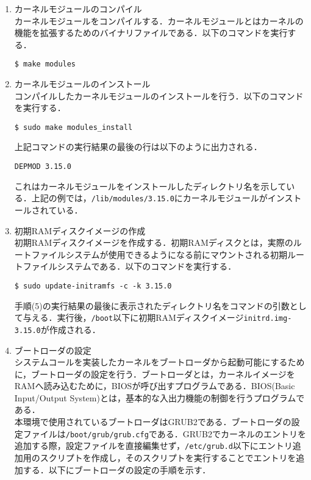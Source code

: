 \documentclass[12pt]{jsarticle}
\begin{document}
\begin{enumerate}
\item カーネルモジュールのコンパイル \\
  カーネルモジュールをコンパイルする．カーネルモジュールとはカーネルの機能を拡張するためのバイナリファイルである．以下のコマンドを実行する．

\begin{verbatim}
$ make modules
\end{verbatim}
  
\item カーネルモジュールのインストール \\
  コンパイルしたカーネルモジュールのインストールを行う．以下のコマンドを実行する．

\begin{verbatim}
$ sudo make modules_install
\end{verbatim}
上記コマンドの実行結果の最後の行は以下のように出力される．

\begin{verbatim}
DEPMOD 3.15.0
\end{verbatim}
これはカーネルモジュールをインストールしたディレクトリ名を示している．上記の例では，\verb|/lib/modules/3.15.0|にカーネルモジュールがインストールされている．

\item 初期RAMディスクイメージの作成 \\
  初期RAMディスクイメージを作成する．初期RAMディスクとは，実際のルートファイルシステムが使用できるようになる前にマウントされる初期ルートファイルシステムである．以下のコマンドを実行する．

\begin{verbatim}
$ sudo update-initramfs -c -k 3.15.0
\end{verbatim}
手順(5)の実行結果の最後に表示されたディレクトリ名をコマンドの引数として与える．実行後，\verb|/boot|以下に初期RAMディスクイメージ\verb|initrd.img-3.15.0|が作成される．

\item ブートローダの設定 \\
  システムコールを実装したカーネルをブートローダから起動可能にするために，ブートローダの設定を行う．ブートローダとは，カーネルイメージをRAMへ読み込むために，BIOSが呼び出すプログラムである．BIOS(Basic Input/Output System)とは，基本的な入出力機能の制御を行うプログラムである\cite{daniel2007}．\\
  本環境で使用されているブートローダはGRUB2である．ブートローダの設定ファイルは\verb|/boot/grub/grub.cfg|である．GRUB2でカーネルのエントリを追加する際，設定ファイルを直接編集せず，\verb|/etc/grub.d|以下にエントリ追加用のスクリプトを作成し，そのスクリプトを実行することでエントリを追加する．以下にブートローダの設定の手順を示す．
  

\end{enumerate}
\end{document}
